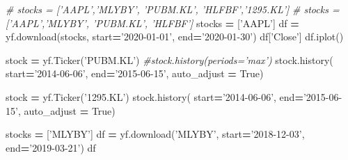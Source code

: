 \documentclass[
]{book}
\newenvironment{Shaded}{\begin{snugshade}}{\end{snugshade}}
\newcommand{\CommentTok}[1]{\textcolor[rgb]{0.37,0.37,0.37}{\textit{#1}}}
\newcommand{\NormalTok}[1]{#1}
\newcommand{\OperatorTok}[1]{\textcolor[rgb]{0.43,0.43,0.43}{\textbf{#1}}}
\newcommand{\StringTok}[1]{\textcolor[rgb]{0.5,0.5,0.5}{#1}}
\newcommand{\VariableTok}[1]{\textcolor[rgb]{0,0,0}{#1}}
\begin{document}
\begin{Shaded}
\begin{Highlighting}[]
\CommentTok{# stocks = ['AAPL','MLYBY', 'PUBM.KL', 'HLFBF','1295.KL']}
\CommentTok{# stocks = ['AAPL','MLYBY', 'PUBM.KL', 'HLFBF']}
\NormalTok{stocks }\OperatorTok{=}\NormalTok{ [}\StringTok{'AAPL'}\NormalTok{]}
\NormalTok{df }\OperatorTok{=}\NormalTok{ yf.download(stocks, start}\OperatorTok{=}\StringTok{'2020-01-01'}\NormalTok{, end}\OperatorTok{=}\StringTok{'2020-01-30'}\NormalTok{)}
\NormalTok{df[}\StringTok{'Close'}\NormalTok{]}
\NormalTok{df.iplot()}
\end{Highlighting}
\end{Shaded}

\begin{Shaded}
\begin{Highlighting}[]
\NormalTok{stock }\OperatorTok{=}\NormalTok{ yf.Ticker(}\StringTok{'PUBM.KL'}\NormalTok{)}
\CommentTok{#stock.history(periods='max')}
\NormalTok{stock.history(  start}\OperatorTok{=}\StringTok{'2014-06-06'}\NormalTok{, end}\OperatorTok{=}\StringTok{'2015-06-15'}\NormalTok{, auto_adjust }\OperatorTok{=} \VariableTok{True}\NormalTok{)}
\end{Highlighting}
\end{Shaded}

\begin{Shaded}
\begin{Highlighting}[]
\NormalTok{stock }\OperatorTok{=}\NormalTok{ yf.Ticker(}\StringTok{'1295.KL'}\NormalTok{)}
\NormalTok{stock.history(  start}\OperatorTok{=}\StringTok{'2014-06-06'}\NormalTok{, end}\OperatorTok{=}\StringTok{'2015-06-15'}\NormalTok{, auto_adjust }\OperatorTok{=} \VariableTok{True}\NormalTok{)}
\end{Highlighting}
\end{Shaded}

\begin{Shaded}
\begin{Highlighting}[]
\NormalTok{stocks }\OperatorTok{=}\NormalTok{ [}\StringTok{'MLYBY'}\NormalTok{]}
\NormalTok{df }\OperatorTok{=}\NormalTok{ yf.download(}\StringTok{'MLYBY'}\NormalTok{, start}\OperatorTok{=}\StringTok{'2018-12-03'}\NormalTok{, end}\OperatorTok{=}\StringTok{'2019-03-21'}\NormalTok{)}
\NormalTok{df}
\end{Highlighting}
\end{Shaded}

  
\end{document}
